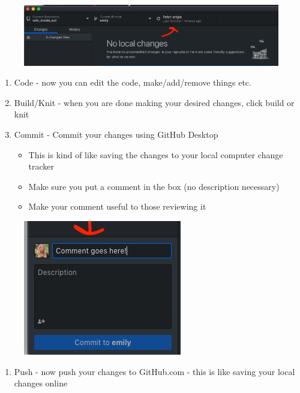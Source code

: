 \documentclass[]{book}
\providecommand{\tightlist}{%
  \setlength{\itemsep}{0pt}\setlength{\parskip}{0pt}}
\begin{document}
\begin{figure}
\centering
\includegraphics{images/research_protocols/github/24.png}
\caption{}
\end{figure}

\begin{enumerate}
\def\labelenumi{\arabic{enumi}.}
\setcounter{enumi}{1}
\item
  Code - now you can edit the code, make/add/remove things etc.
\item
  Build/Knit - when you are done making your desired changes, click build or knit
\item
  Commit - Commit your changes using GitHub Desktop

  \begin{itemize}
  \tightlist
  \item
    This is kind of like saving the changes to your local computer change tracker
  \item
    Make sure you put a comment in the box (no description necessary)
  \item
    Make your comment useful to those reviewing it
  \end{itemize}
\end{enumerate}

\begin{figure}
\centering
\includegraphics{images/research_protocols/github/25.png}
\caption{}
\end{figure}

\begin{enumerate}
\def\labelenumi{\arabic{enumi}.}
\setcounter{enumi}{4}
\tightlist
\item
  Push - now push your changes to GitHub.com - this is like saving your local changes online
\end{enumerate}
\end{document}
